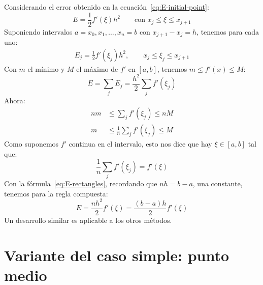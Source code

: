   Considerando el error obtenido en la ecuación~\eqref{eq:E-initial-point}:
  \begin{equation}
    E
      = \frac{1}{2} f'(\xi) h^2
          \qquad \text{con \(x_j \le \xi \le x_{j + 1}\)}
  \end{equation}
  Suponiendo intervalos \(a = x_0, x_1, \dotsc, x_n = b\)
  con \(x_{j + 1} - x_j = h\),
  tenemos para cada uno:
  \begin{align*}
    E_j
      = \frac{1}{2} f'(\xi_j) h^2, \qquad x_j \le \xi _j \le x_{j + 1}
  \end{align*}
  Con \(m\) el mínimo y \(M\) el máximo de \(f'\) en \([a, b]\),
  tenemos \(m \le f'(x) \le M\):
  \begin{equation}
    \label{eq:E-rectangles}
    E
      = \sum_j E_j
      = \frac{h^2}{2} \sum_j f'(\xi _j)
  \end{equation}
  Ahora:
  \begin{align*}
    n m
      &\le \sum_j f'(\xi_j) \le n M \\
    m
      &\le \frac{1}{n} \sum_j f'(\xi_j) \le M
  \end{align*}
  Como suponemos \(f'\) continua en el intervalo,
  esto nos dice que hay \(\xi \in [a, b]\) tal que:
  \begin{equation*}
    \frac{1}{n} \sum_j f'(\xi_j)
      = f'(\xi)
  \end{equation*}
  Con la fórmula~\eqref{eq:E-rectangles},
  recordando que \(n h = b - a\),
  una constante,
  tenemos para la regla compuesta:
  \begin{equation}
    \label{eq:E-rectangles-composite}
    E
      = \frac{n h^2}{2} f'(\xi)
      = \frac{(b - a) h}{2} f'(\xi)
  \end{equation}
  Un desarrollo similar es aplicable a los otros métodos.

\section{Variante del caso simple: punto medio}

